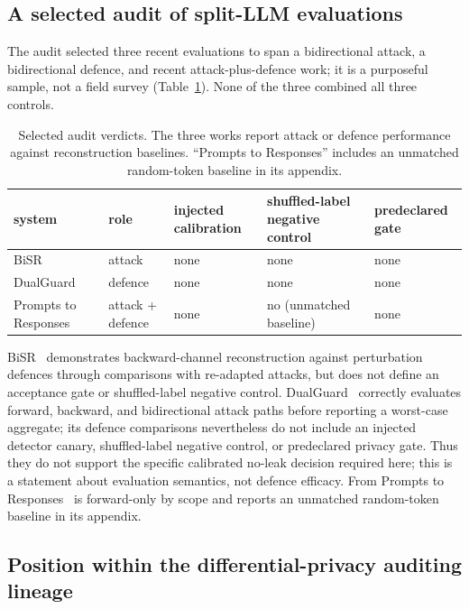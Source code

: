 \documentclass[11pt]{article}
\begin{document}
\subsection{A selected audit of split-LLM evaluations}

The audit selected three recent evaluations to span a bidirectional attack, a
bidirectional defence, and recent attack-plus-defence work; it is a purposeful
sample, not a field survey (Table~\ref{tab:external}). None of the three
combined all three controls.

\begin{table}[H]
\centering\small
\begin{tabularx}{\textwidth}{@{}l l X X X@{}}
\toprule
system & role & injected calibration & shuffled-label negative control & predeclared gate \\
\midrule
BiSR~\cite{bisr} & attack & none & none & none \\
DualGuard~\cite{dualguard} & defence & none & none & none \\
Prompts to Responses~\cite{promptstoresponses} & attack + defence & none & no (unmatched baseline) & none \\
\bottomrule
\end{tabularx}


\caption{Selected audit verdicts. The three works
report attack or defence performance against reconstruction baselines.
``Prompts to Responses'' includes an
unmatched random-token baseline in its appendix.}
\label{tab:external}
\end{table}

BiSR~\cite{bisr} demonstrates backward-channel reconstruction against
perturbation defences through comparisons with re-adapted attacks, but does not
define an acceptance gate or shuffled-label negative control.
DualGuard~\cite{dualguard} correctly
evaluates forward, backward, and bidirectional attack paths before reporting a
worst-case aggregate; its defence comparisons nevertheless do not include an
injected detector canary, shuffled-label negative control, or predeclared
privacy gate. Thus they
do not support the specific calibrated no-leak decision required here; this is
a statement about evaluation semantics, not defence efficacy. From Prompts to
Responses~\cite{promptstoresponses} is forward-only by scope and reports an
unmatched random-token baseline in its appendix.

\subsection{Position within the differential-privacy auditing lineage}
\end{document}
